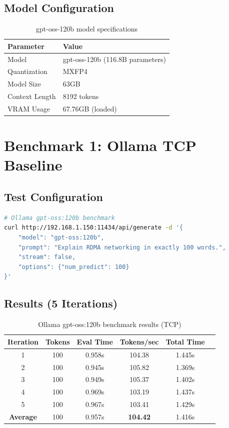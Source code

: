 \documentclass[10pt,letterpaper]{article}
\begin{document}
\subsection{Model Configuration}

\begin{table}[H]
\centering
\small
\begin{tabular}{@{}ll@{}}
\toprule
\textbf{Parameter} & \textbf{Value} \\
\midrule
Model & gpt-oss-120b (116.8B parameters) \\
Quantization & MXFP4 \\
Model Size & 63GB \\
Context Length & 8192 tokens \\
VRAM Usage & 67.76GB (loaded) \\
\bottomrule
\end{tabular}
\caption{gpt-oss-120b model specifications}
\end{table}

\section{Benchmark 1: Ollama TCP Baseline}

\subsection{Test Configuration}

\begin{lstlisting}[language=bash]
# Ollama gpt-oss:120b benchmark
curl http://192.168.1.150:11434/api/generate -d '{
    "model": "gpt-oss:120b",
    "prompt": "Explain RDMA networking in exactly 100 words.",
    "stream": false,
    "options": {"num_predict": 100}
}'
\end{lstlisting}

\subsection{Results (5 Iterations)}

\begin{table}[H]
\centering
\small
\begin{tabular}{@{}cccccc@{}}
\toprule
\textbf{Iteration} & \textbf{Tokens} & \textbf{Eval Time} & \textbf{Tokens/sec} & \textbf{Total Time} \\
\midrule
1 & 100 & 0.958s & 104.38 & 1.445s \\
2 & 100 & 0.945s & 105.82 & 1.369s \\
3 & 100 & 0.949s & 105.37 & 1.402s \\
4 & 100 & 0.969s & 103.19 & 1.437s \\
5 & 100 & 0.967s & 103.41 & 1.429s \\
\midrule
\textbf{Average} & 100 & 0.957s & \textbf{104.42} & 1.416s \\
\bottomrule
\end{tabular}
\caption{Ollama gpt-oss:120b benchmark results (TCP)}
\end{table}
\end{document}
